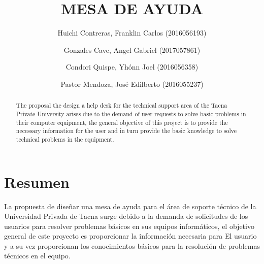 \documentclass[preprint,12pt]{elsarticle}
\begin{document}
	
	\begin{frontmatter} 

		\title{\huge MESA DE AYUDA}
		
		\author{Huichi Contreras, Franklin Carlos            (2016056193)}
		\author{Gonzales Cave, Angel Gabriel              	(2017057861)}
		\author{Condori Quispe, Yhónn Joel	         	(2016056358)} 
		\author{Pastor Mendoza, José Edilberto             	(2016055237)} 
		\address{Escuela Profesional de Ingeniería de Sistemas}
		\address{Universidad Privada de Tacna}
		\address{Tacna, Perú}
		

		\begin{abstract}
The proposal the design a help desk for the technical support area of the Tacna Private University arises due to the demand of user requests to solve basic problems in their computer equipment, the general objective of this project is to provide the necessary information for the user and in turn provide the basic knowledge to solve technical problems in the equipment.

		\end{abstract}


	\end{frontmatter}


\section{Resumen}
La propuesta de diseñar una mesa de ayuda para el área de soporte técnico de la Universidad Privada de Tacna surge debido a la demanda de solicitudes de los usuarios para resolver problemas básicos en sus equipos informáticos, el objetivo general de este proyecto es proporcionar la información necesaria para El usuario y a su vez proporcionan los conocimientos básicos para la resolución de problemas técnicos en el equipo.


\end{document}
